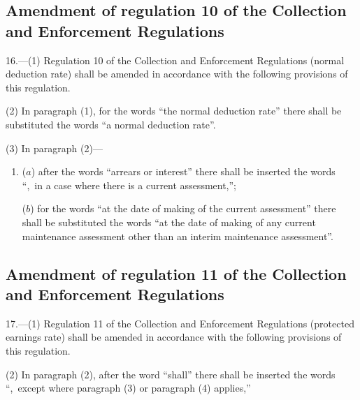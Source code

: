 \documentclass[12pt,a4paper]{article}
\begin{document}
\subsection[16. Amendment of regulation 10 of the Collection and Enforcement Regulations]{Amendment of regulation 10 of the Collection and Enforcement Regulations}

16.—(1) Regulation 10 of the Collection and Enforcement Regulations (normal deduction rate) shall be amended in accordance with the following provisions of this regulation.

(2) In paragraph (1), for the words “the normal deduction rate” there shall be substituted the words “a normal deduction rate”.

(3) In paragraph (2)—
\begin{enumerate}\item[]
($a$) after the words “arrears or interest” there shall be inserted the words “,~in a case where there is a current assessment,”;

($b$) for the words “at the date of making of the current assessment” there shall be substituted the words “at the date of making of any current maintenance assessment other than an interim maintenance assessment”.
\end{enumerate}

\subsection[17. Amendment of regulation 11 of the Collection and Enforcement Regulations]{Amendment of regulation 11 of the Collection and Enforcement Regulations}

17.—(1) Regulation 11 of the Collection and Enforcement Regulations (protected earnings rate) shall be amended in accordance with the following provisions of this regulation.

(2) In paragraph (2), after the word “shall” there shall be inserted the words ``,~except where paragraph (3) or paragraph (4) applies,”
\end{document}
